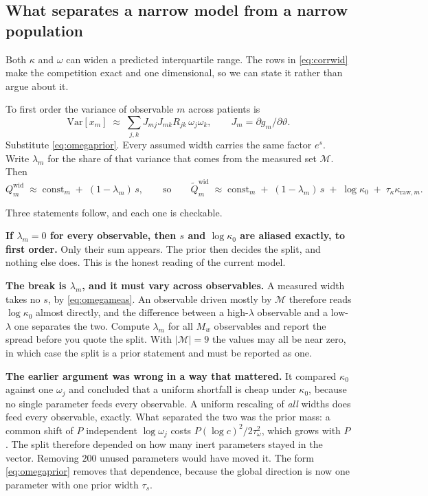 \documentclass[11pt]{article}
\newcommand{\Mset}{\mathcal{M}}
\newcommand{\wid}{\mathrm{wid}}
\begin{document}
\subsection{What separates a narrow model from a narrow population}
\label{sec:widthid}

Both $\kappa$ and $\omega$ can widen a predicted interquartile range. The rows in
\eqref{eq:corrwid} make the competition exact and one dimensional, so we can
state it rather than argue about it.

To first order the variance of observable $m$ across patients is
\begin{equation}
\mathrm{Var}[x_m] \;\approx\; \sum_{j,k} J_{mj}J_{mk}R_{jk}\,\omega_j\omega_k,
\qquad J_m=\partial g_m/\partial\vartheta .
\end{equation}
Substitute \eqref{eq:omegaprior}. Every assumed width carries the same factor
$e^{s}$. Write $\lambda_m$ for the share of that variance that comes from the
measured set $\Mset$. Then
\begin{equation}
Q^\wid_m \;\approx\; \text{const}_m \;+\; (1-\lambda_m)\,s,
\qquad\text{so}\qquad
\widetilde Q^\wid_m \;\approx\; \text{const}_m \;+\; (1-\lambda_m)\,s \;+\;
\log\kappa_0 \;+\; \tau_\kappa\kappa_{\text{raw},m}.
\label{eq:ridge}
\end{equation}

Three statements follow, and each one is checkable.

\textbf{If $\lambda_m=0$ for every observable, then $s$ and $\log\kappa_0$ are
aliased exactly, to first order.} Only their sum appears. The prior then decides
the split, and nothing else does. This is the honest reading of the current
model.

\textbf{The break is $\lambda_m$, and it must vary across observables.} A
measured width takes no $s$, by \eqref{eq:omegameas}. An observable driven mostly
by $\Mset$ therefore reads $\log\kappa_0$ almost directly, and the difference
between a high-$\lambda$ observable and a low-$\lambda$ one separates the two.
Compute $\lambda_m$ for all $M_w$ observables and report the spread before you
quote the split. With $|\Mset|=9$ the values may all be near zero, in which case
the split is a prior statement and must be reported as one.

\textbf{The earlier argument was wrong in a way that mattered.} It compared
$\kappa_0$ against one $\omega_j$ and concluded that a uniform shortfall is cheap
under $\kappa_0$, because no single parameter feeds every observable. A uniform
rescaling of \emph{all} widths does feed every observable, exactly. What
separated the two was the prior mass: a common shift of $P$ independent
$\log\omega_j$ costs $P(\log c)^2/2\tau_\omega^2$, which grows with $P$. The
split therefore depended on how many inert parameters stayed in the vector.
Removing $200$ unused parameters would have moved it. The form
\eqref{eq:omegaprior} removes that dependence, because the global direction is
now one parameter with one prior width $\tau_s$.
\end{document}
